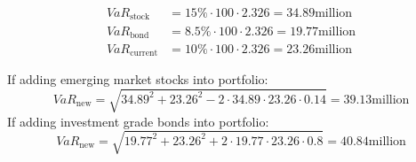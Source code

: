 \begin{itemize}
\begin{align*}
VaR_{\text{stock}} &= 15\% \cdot 100 \cdot 2.326 = 34.89 \text{million} \\
VaR_{\text{bond}} &= 8.5\% \cdot 100 \cdot 2.326 = 19.77 \text{million} \\
VaR_{\text{current}} &= 10\% \cdot 100 \cdot 2.326 = 23.26 \text{million}
\end{align*}

If adding emerging market stocks into portfolio:
\[
VaR_{\text{new}} = \sqrt{34.89^2 + 23.26^2 - 2 \cdot 34.89 \cdot 23.26 \cdot 0.14} = 39.13 \text{million}
\]
If adding investment grade bonds into portfolio:
\[
VaR_{\text{new}} = \sqrt{19.77^2 + 23.26^2 + 2 \cdot 19.77 \cdot 23.26 \cdot 0.8} = 40.84 \text{million}
\]

\end{itemize}




